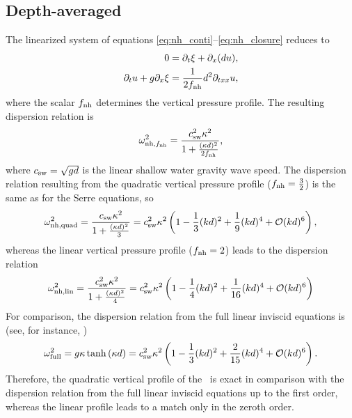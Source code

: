 \subsection{Depth-averaged \nheswe}
The linearized system of equations \eqref{eq:nh_conti}--\eqref{eq:nh_closure} reduces to 
\begin{align*}
 0 &= \partial_t\xi+\partial_x(du), \\
 \partial_tu + g\partial_x\xi &= \frac{1}{2f_{\text{nh}}}d^2\partial_{txx} u,
\end{align*}
where the scalar $f_{\text{nh}}$ determines the vertical pressure profile. The resulting dispersion relation is
\begin{equation}
 \omega^2_{\text{nh,}f_{\text{nh}}}=\frac{c_{\text{sw}}^2\kappa^2}{1+\frac{(\kappa d)^2}{2f_{\text{nh}}}},
 \label{eq:disp_nh_fnh}
\end{equation}
where $c_{\text{sw}}=\sqrt{gd}$ is the linear shallow water gravity wave speed.
The dispersion relation resulting from the quadratic vertical pressure profile ($f_{\text{nh}}=\frac{3}{2}$) is the same as for the Serre equations, so
\begin{equation}
 \omega^2_{\text{nh,quad}}=\frac{c_{\text{sw}}\kappa^2}{1+\frac{(\kappa d)^2}{3}}=c_{\text{sw}}^2\kappa^2\left(1-\frac{1}{3}(kd)^2+\frac{1}{9}(kd)^4+\mathcal{O}(kd)^6 \right),
 \label{eq:disp_nh_quadr}
\end{equation}
whereas the linear vertical pressure profile ($f_{\text{nh}}=2$) leads to the dispersion relation
\begin{equation}
 \omega^2_{\text{nh,lin}}=\frac{c_{\text{sw}}^2\kappa^2}{1+\frac{(\kappa d)^2}{4}}=c_{\text{sw}}^2\kappa^2\left(1-\frac{1}{4}(kd)^2+\frac{1}{16}(kd)^4+\mathcal{O}(kd)^6 \right) \label{eq:disp_nh_lin}
\end{equation}
For comparison, the dispersion relation from the full linear inviscid equations
is (see, for instance, \cite{Whitham.1974})
\begin{equation}
 \omega^2_{\text{full}}=g\kappa\tanh\left(\kappa d  \right)=c_{\text{sw}}^2\kappa^2\left(1-\frac{1}{3}(kd)^2+\frac{2}{15}(kd)^4+\mathcal{O}(kd)^6 \right) .
 \label{eq:disp_full}
\end{equation}
Therefore, the quadratic vertical profile of the \nhp\ is exact in comparison with the dispersion relation from the full linear inviscid equations up to the first order, whereas the linear profile leads to a match only in the zeroth order.
